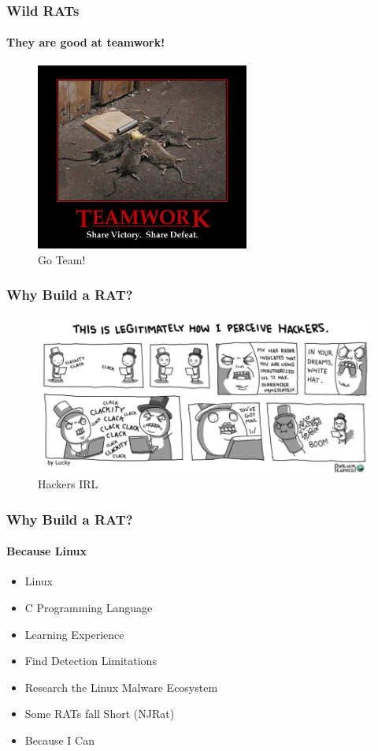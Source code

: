 \documentclass[aspectratio=169]{beamer}
\begin{document}
\begin{frame}
  \frametitle{Wild RATs}
  \framesubtitle{They are good at teamwork!}
  \begin{center}
    \begin{figure}
      \includegraphics[width=7cm,keepaspectratio]{team_work}
      \caption{Go Team!}
    \end{figure}
  \end{center}
\end{frame}

\begin{frame}
  \frametitle{Why Build a RAT?}
  \begin{center}
    \begin{figure}
      \includegraphics[width=12cm,keepaspectratio]{hackers_meme}
      \caption{Hackers IRL}
    \end{figure}
  \end{center}
\end{frame}

\begin{frame}
  \frametitle{Why Build a RAT?}
  \framesubtitle{Because Linux}
  \begin{itemize}
  \item{Linux}
  \item{C Programming Language}
  \item{Learning Experience}
  \item{Find Detection Limitations}
  \item{Research the Linux Malware Ecosystem}
  \item{Some RATs fall Short (NJRat)}
  \item{Because I Can}
  \end{itemize}
\end{frame}
\end{document}
